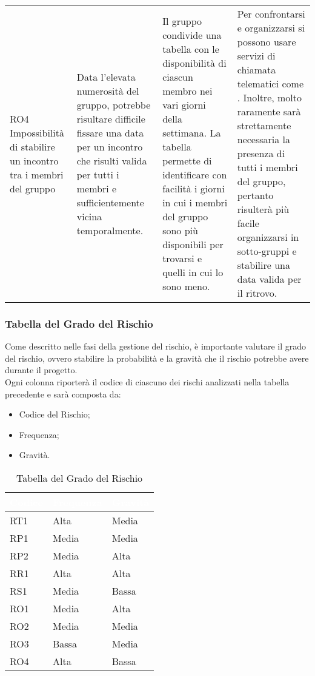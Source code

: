 {\begin{longtable}{ C{2.1cm} C{4cm} C{4cm} C{4.9cm}}
RO4 \newline Impossibilità di stabilire un incontro tra i membri del gruppo &
Data l'elevata numerosità del gruppo, potrebbe risultare difficile fissare una data per un incontro che risulti valida per tutti i membri e sufficientemente vicina temporalmente. &
Il gruppo condivide una tabella con le disponibilità di ciascun membro nei vari giorni della settimana. La tabella permette di identificare con facilità i giorni in cui i membri del gruppo sono più disponibili per trovarsi e quelli in cui lo sono meno. &
Per confrontarsi e organizzarsi si possono usare servizi di chiamata telematici come . Inoltre, molto raramente sarà strettamente necessaria la presenza di tutti i membri del gruppo, pertanto risulterà più facile organizzarsi in sotto-gruppi e stabilire una data valida per il ritrovo. \\

\end{longtable}
}

\subsubsection{Tabella del Grado del Rischio}
Come descritto nelle fasi della gestione del rischio, è importante valutare il grado del rischio, ovvero stabilire la probabilità e la gravità che il rischio potrebbe avere durante il progetto.\\
Ogni colonna riporterà il codice di ciascuno dei rischi analizzati nella tabella precedente e sarà composta da:
\begin{itemize}
	\item Codice del Rischio;
	\item Frequenza;
	\item Gravità.
\end{itemize}

{
\renewcommand{\arraystretch}{2}
\centering
	
\begin{longtable}{C{2cm} C{3cm} C{3cm}}
\caption{Tabella del Grado del Rischio}\\

\textcolor{white}{\textbf{Codice}} & 
\textcolor{white}{\textbf{Frequenza}} & 
\textcolor{white}{\textbf{Gravità}}\\	
\endhead

RT1 &  Alta & Media \\
RP1 & Media & Media \\
RP2 & Media &  Alta \\
RR1 &  Alta &  Alta \\
RS1 & Media & Bassa \\
RO1 & Media &  Alta \\
RO2 & Media & Media \\
RO3 & Bassa & Media \\
RO4 &  Alta & Bassa \\

\end{longtable}
}

